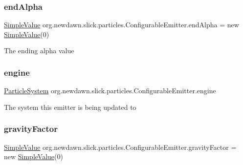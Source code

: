 \subsubsection{\texorpdfstring{end\+Alpha}{endAlpha}}
{\footnotesize\ttfamily \mbox{\hyperlink{classorg_1_1newdawn_1_1slick_1_1particles_1_1_configurable_emitter_1_1_simple_value}{Simple\+Value}} org.\+newdawn.\+slick.\+particles.\+Configurable\+Emitter.\+end\+Alpha = new \mbox{\hyperlink{classorg_1_1newdawn_1_1slick_1_1particles_1_1_configurable_emitter_1_1_simple_value}{Simple\+Value}}(0)}

The ending alpha value \mbox{\label{classorg_1_1newdawn_1_1slick_1_1particles_1_1_configurable_emitter_ad35b105949c7f6c67f4dba02287b3a09}} 
\subsubsection{\texorpdfstring{engine}{engine}}
{\footnotesize\ttfamily \mbox{\hyperlink{classorg_1_1newdawn_1_1slick_1_1particles_1_1_particle_system}{Particle\+System}} org.\+newdawn.\+slick.\+particles.\+Configurable\+Emitter.\+engine\hspace{0.3cm}{\ttfamily [private]}}

The system this emitter is being updated to \mbox{\label{classorg_1_1newdawn_1_1slick_1_1particles_1_1_configurable_emitter_a70357a5c44e704c90f3a0b905978d3c8}} 
\subsubsection{\texorpdfstring{gravity\+Factor}{gravityFactor}}
{\footnotesize\ttfamily \mbox{\hyperlink{classorg_1_1newdawn_1_1slick_1_1particles_1_1_configurable_emitter_1_1_simple_value}{Simple\+Value}} org.\+newdawn.\+slick.\+particles.\+Configurable\+Emitter.\+gravity\+Factor = new \mbox{\hyperlink{classorg_1_1newdawn_1_1slick_1_1particles_1_1_configurable_emitter_1_1_simple_value}{Simple\+Value}}(0)}


